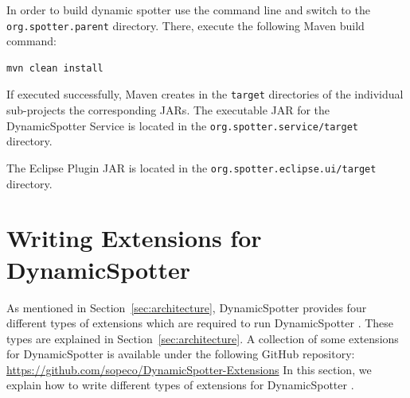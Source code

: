 \documentclass{report}
\newcommand{\DS}{DynamicSpotter }
\newcommand{\link}[1]{\textcolor[rgb]{0.0,0.0,1.0}{\href{#1}{#1}}}
\begin{document}
In order to build dynamic spotter use the command line and switch to the \texttt{org.spotter.parent} directory. There,
execute the following Maven build command:
\begin{lstlisting}[language=sh,morekeywords={java,javaagent,port, rootDir}, frame=single]
mvn clean install
\end{lstlisting}
If executed successfully, Maven creates in the \texttt{target} directories of the individual sub-projects the
corresponding JARs. The executable JAR for the \DS Service is located in the \texttt{org.spotter.service/target}
directory. 

The Eclipse Plugin JAR is located in the \texttt{org.spotter.eclipse.ui/target} directory.


\newpage
\section{Writing Extensions for \DS}
\label{sec:extensions}
As mentioned in Section~\ref{sec:architecture}, \DS provides four different types of extensions which are required to
run \DS. These types are explained in Section~\ref{sec:architecture}. A collection of some extensions for \DS is
available under the following GitHub repository:
\newline
\newline
\link{https://github.com/sopeco/DynamicSpotter-Extensions}
\newline
\newline
In this section, we explain how to write different types of extensions for \DS.
\end{document}
